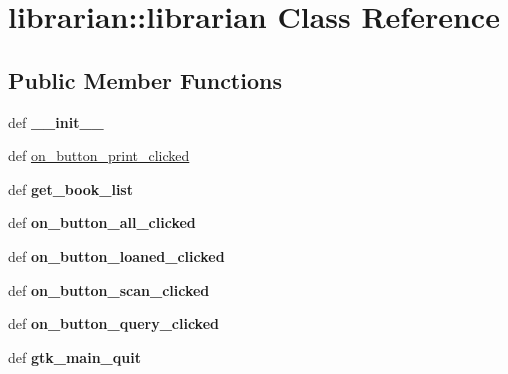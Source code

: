 \hypertarget{classlibrarian_1_1librarian}{
\section{librarian::librarian Class Reference}
\label{classlibrarian_1_1librarian}
}
\subsection*{Public Member Functions}
\begin{DoxyCompactItemize}
\item 
\hypertarget{classlibrarian_1_1librarian_a38767385296af734d843625e880b0f8c}{
def {\bfseries \_\-\_\-init\_\-\_\-}}
\label{classlibrarian_1_1librarian_a38767385296af734d843625e880b0f8c}

\item 
def \hyperlink{classlibrarian_1_1librarian_a8d9587a840f943752194b2c8b61f18a3}{on\_\-button\_\-print\_\-clicked}
\item 
\hypertarget{classlibrarian_1_1librarian_af1b5a6a4ddf9b300601f1cdc6737ecd4}{
def {\bfseries get\_\-book\_\-list}}
\label{classlibrarian_1_1librarian_af1b5a6a4ddf9b300601f1cdc6737ecd4}

\item 
\hypertarget{classlibrarian_1_1librarian_a7fb611e38bedeac2295e1ecb2b8aa2cc}{
def {\bfseries on\_\-button\_\-all\_\-clicked}}
\label{classlibrarian_1_1librarian_a7fb611e38bedeac2295e1ecb2b8aa2cc}

\item 
\hypertarget{classlibrarian_1_1librarian_a7bb690bc8c84830399479b6f47eef8b0}{
def {\bfseries on\_\-button\_\-loaned\_\-clicked}}
\label{classlibrarian_1_1librarian_a7bb690bc8c84830399479b6f47eef8b0}

\item 
\hypertarget{classlibrarian_1_1librarian_ad44a8c5d7a8ccb8d2c75e13eccb276b1}{
def {\bfseries on\_\-button\_\-scan\_\-clicked}}
\label{classlibrarian_1_1librarian_ad44a8c5d7a8ccb8d2c75e13eccb276b1}

\item 
\hypertarget{classlibrarian_1_1librarian_af71bf023c78a90863f2505562ad95d95}{
def {\bfseries on\_\-button\_\-query\_\-clicked}}
\label{classlibrarian_1_1librarian_af71bf023c78a90863f2505562ad95d95}

\item 
\hypertarget{classlibrarian_1_1librarian_aa904a6cfbe8a124965f9e2c148f64227}{
def {\bfseries gtk\_\-main\_\-quit}}
\label{classlibrarian_1_1librarian_aa904a6cfbe8a124965f9e2c148f64227}

\end{DoxyCompactItemize}
